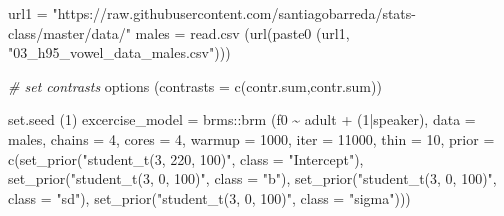 \documentclass[
]{book}
\newenvironment{Shaded}{\begin{snugshade}}{\end{snugshade}}
\newcommand{\AttributeTok}[1]{\textcolor[rgb]{0.77,0.63,0.00}{#1}}
\newcommand{\CommentTok}[1]{\textcolor[rgb]{0.56,0.35,0.01}{\textit{#1}}}
\newcommand{\DecValTok}[1]{\textcolor[rgb]{0.00,0.00,0.81}{#1}}
\newcommand{\FunctionTok}[1]{\textcolor[rgb]{0.00,0.00,0.00}{#1}}
\newcommand{\NormalTok}[1]{#1}
\newcommand{\OtherTok}[1]{\textcolor[rgb]{0.56,0.35,0.01}{#1}}
\newcommand{\SpecialCharTok}[1]{\textcolor[rgb]{0.00,0.00,0.00}{#1}}
\newcommand{\StringTok}[1]{\textcolor[rgb]{0.31,0.60,0.02}{#1}}
\begin{document}
\begin{Shaded}
\begin{Highlighting}[]
\NormalTok{url1 }\OtherTok{=} \StringTok{"https://raw.githubusercontent.com/santiagobarreda/stats{-}class/master/data/"}
\NormalTok{males }\OtherTok{=} \FunctionTok{read.csv}\NormalTok{ (}\FunctionTok{url}\NormalTok{(}\FunctionTok{paste0}\NormalTok{ (url1, }\StringTok{"03\_h95\_vowel\_data\_males.csv"}\NormalTok{)))}

\CommentTok{\# set contrasts}
\FunctionTok{options}\NormalTok{ (}\AttributeTok{contrasts =} \FunctionTok{c}\NormalTok{(}\StringTok{\textquotesingle{}contr.sum\textquotesingle{}}\NormalTok{,}\StringTok{\textquotesingle{}contr.sum\textquotesingle{}}\NormalTok{))}

\FunctionTok{set.seed}\NormalTok{ (}\DecValTok{1}\NormalTok{)}
\NormalTok{excercise\_model }\OtherTok{=}  
\NormalTok{  brms}\SpecialCharTok{::}\FunctionTok{brm}\NormalTok{ (f0 }\SpecialCharTok{\textasciitilde{}}\NormalTok{ adult }\SpecialCharTok{+}\NormalTok{ (}\DecValTok{1}\SpecialCharTok{|}\NormalTok{speaker), }\AttributeTok{data =}\NormalTok{ males, }\AttributeTok{chains =} \DecValTok{4}\NormalTok{, }\AttributeTok{cores =} \DecValTok{4}\NormalTok{,}
       \AttributeTok{warmup =} \DecValTok{1000}\NormalTok{, }\AttributeTok{iter =} \DecValTok{11000}\NormalTok{, }\AttributeTok{thin =} \DecValTok{10}\NormalTok{,}
       \AttributeTok{prior =} \FunctionTok{c}\NormalTok{(}\FunctionTok{set\_prior}\NormalTok{(}\StringTok{"student\_t(3, 220, 100)"}\NormalTok{, }\AttributeTok{class =} \StringTok{"Intercept"}\NormalTok{),}
                 \FunctionTok{set\_prior}\NormalTok{(}\StringTok{"student\_t(3, 0, 100)"}\NormalTok{, }\AttributeTok{class =} \StringTok{"b"}\NormalTok{),}
                 \FunctionTok{set\_prior}\NormalTok{(}\StringTok{"student\_t(3, 0, 100)"}\NormalTok{, }\AttributeTok{class =} \StringTok{"sd"}\NormalTok{),}
                 \FunctionTok{set\_prior}\NormalTok{(}\StringTok{"student\_t(3, 0, 100)"}\NormalTok{, }\AttributeTok{class =} \StringTok{"sigma"}\NormalTok{)))}
\end{Highlighting}
\end{Shaded}
\end{document}
